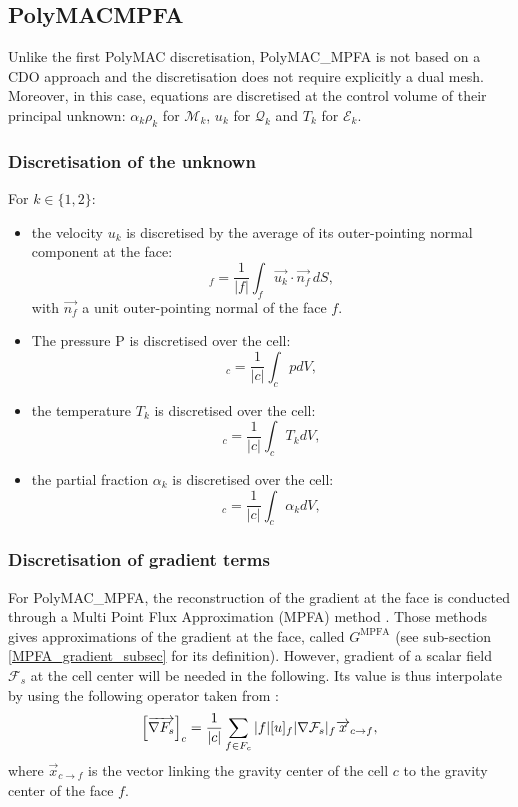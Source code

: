 \subsection{PolyMAC\textunderscore{}MPFA}
Unlike the first PolyMAC discretisation, PolyMAC\_MPFA is not based on a CDO approach and the discretisation does not require explicitly a dual mesh. Moreover, in this case, equations are discretised at the control volume of their principal unknown: $\alpha _k \rho _k$ for $\mathcal{M}_k$, $u_k$ for $\mathcal{Q}_k$ and $T_k$ for $\mathcal{E}_k$.

\subsubsection{Discretisation of the unknown}
For $k \in \{1,2\}$:
\begin{itemize}
    \item the velocity $ u_k $ is discretised by the average of its outer-pointing normal component at the face:
    \begin{equation}
        [u_k] _f = \frac{1}{|f|} \int _f \vec{u_k} \cdot \vec{n_f} \,  dS,
    \end{equation}
    with $\vec{n_f}$ a unit outer-pointing normal of the face $f$.
    \item The pressure P is discretised over the cell:
    \begin{equation}
        [P]_c = \frac{1}{|c|} \int _c p dV,
    \end{equation}
    \item the temperature $T_k$ is discretised over the cell:
    \begin{equation}
        [T_k]_c = \frac{1}{|c|} \int _c T_k dV,
    \end{equation}
    \item the partial fraction $ \alpha _k$ is discretised over the cell:
    \begin{equation}
        [\alpha _k]_c = \frac{1}{|c|} \int _c \alpha _k dV,
    \end{equation}
\end{itemize}
\subsubsection*{Discretisation of gradient terms}
For PolyMAC\_MPFA, the reconstruction of the gradient at the face is conducted through a Multi Point Flux Approximation (MPFA) method \cite[section 4.1]{droniou2018gradient}. Those methods gives approximations of the gradient at the face, called $G^{\text{MPFA}}$ (see sub-section \ref{MPFA_gradient_subsec} for its definition). However, gradient of a scalar field $\mathcal{F}_s$ at the cell center will be needed in the following. Its value is thus interpolate by using the following operator taken from \cite{bonelle2014}:
\begin{equation}
    \left[ \overrightarrow{\nabla F_s} \right]_c = \frac{1}{|c|} \sum _{f \in F_c} |f| [u]_f |\nabla  \mathcal{F}_s |_f \overrightarrow{x}_{c \rightarrow f},
\end{equation}
where $\vec{x}_{c \rightarrow f}$ is the vector linking the gravity center of the cell $c$ to the gravity center of the face $f$.

